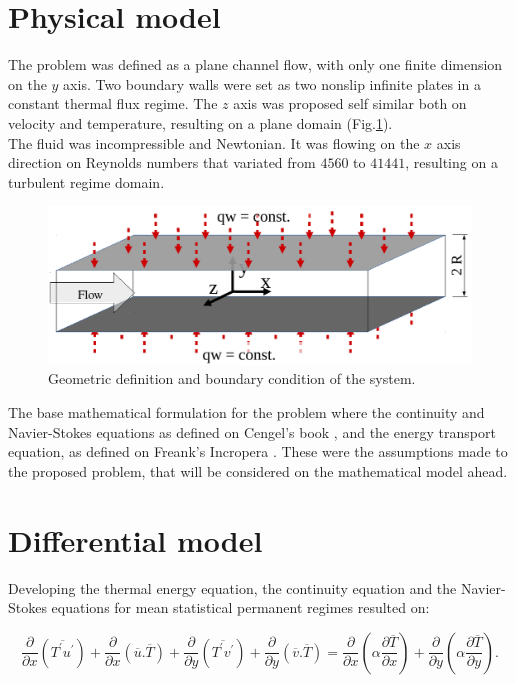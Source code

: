 \documentclass[10pt]{article} %
\begin{document}
\section{Physical model}

The problem was defined as a plane channel flow, with only one finite dimension on the $y$ axis. Two boundary walls were set as two nonslip infinite plates in a constant thermal flux regime. The $z$ axis was proposed self similar both on velocity and temperature, resulting on a plane domain (Fig.\ref{figure.1}). \\
The fluid was incompressible and Newtonian. It was flowing on the $x$ axis direction on Reynolds numbers that variated from $4560$ to $41441$, resulting on a turbulent regime domain. 

\begin{figure}[h!]
	\centering
	\includegraphics[angle=0, scale=0.50]{figure1}
	\caption{Geometric definition and boundary condition of the system.}
	\label{figure.1}
\end{figure}

The base mathematical formulation for the problem where the continuity and Navier-Stokes equations as defined on Cengel's book \cite{Cengel}, and the  energy transport equation, as defined on Freank's Incropera \cite{Incropera}. These were the assumptions made to the proposed problem, that will be considered on the mathematical model ahead.









\section{Differential model}

Developing the thermal energy equation, the continuity equation and the Navier-Stokes equations for mean statistical permanent regimes resulted on: 


\begin{equation}\label{energy permanent}
\frac{\partial{}}{\partial{x}} \left(\overline{T^\prime u^\prime}\right) + \frac{\partial{}}{\partial{x}}\left(\overline{u}.\overline{T}\right)     + 
\frac{\partial{}}{\partial{y}} \left(\overline{T^\prime v^\prime}\right) + \frac{\partial{}}{\partial{y}}\left(\overline{v}.\overline{T}\right) 
=
{\frac{\partial{}}{\partial{x}}} \left(\alpha {\frac{\partial{\overline{T}}}{\partial{x}}} \right) +
{\frac{\partial{}}{\partial{y}}} \left(\alpha {\frac{\partial{\overline{T}}}{\partial{y}}} \right). 
\end{equation}
\end{document}
